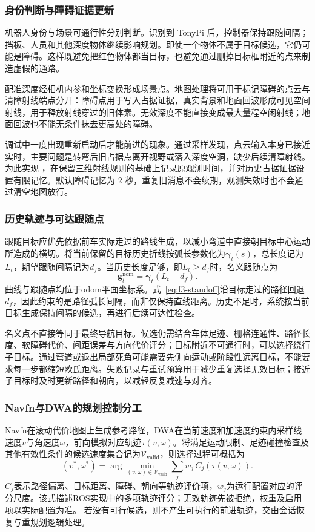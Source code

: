 \subsubsection{身份判断与障碍证据更新}
机器人身份与场景可通行性分别判断。识别到 TonyPi 后，控制器保持跟随间隔；挡板、人员和其他深度物体继续影响规划。即使一个物体不属于目标候选，它仍可能是障碍。这样既避免把红色物体都当目标，也避免通过删掉目标框附近的点来制造虚假的通路。

配准深度经相机内参和坐标变换形成场景点。地图处理将可用于标记障碍的点云与清障射线端点分开：障碍点用于写入占据证据，真实背景和地面回波形成可见空间射线，用于释放射线穿过的旧体素。无效深度不能直接变成最大量程空闲射线；地面回波也不能无条件抹去更高处的障碍。

调试中一度出现重新启动后才能前进的现象。通过采样发现，点云输入本身已接近实时，主要问题是转弯后旧占据点离开视野或落入深度空洞，缺少后续清障射线。为此实现 ，在保留三维射线规则的基础上记录原观测时间，并对历史占据证据设置有限记忆。默认障碍记忆为 2 秒，重复旧消息不会续期，观测失效时也不会通过清空地图放行。
\subsubsection{历史轨迹与可达跟随点}
跟随目标应优先依据前车实际走过的路线生成，以减小弯道中直接朝目标中心运动所造成的横切。将当前保留的目标历史折线按弧长参数化为$\boldsymbol\gamma_t(s)$，总长度记为$L_t$，期望跟随间隔记为$d_f$。当历史长度足够，即$L_t\geq d_f$时，名义跟随点为
\begin{equation}\label{eq:f3-standoff}
\mathbf g_t^{\mathrm{nom}}=\boldsymbol\gamma_t(L_t-d_f).
\end{equation}
曲线与跟随点均位于odom平面坐标系。式~\eqref{eq:f3-standoff}沿目标走过的路径回退$d_f$，因此约束的是路径弧长间隔，而非仅保持直线距离。历史不足时，系统按当前目标生成保持间隔的候选，再进行后续可达性检查。

名义点不直接等同于最终导航目标。候选仍需结合车体足迹、栅格连通性、路径长度、软障碍代价、间距误差与方向代价评分；目标附近不可通行时，可以选择绕行子目标。通过弯道或退出局部死角可能需要先侧向运动或阶段性远离目标，不能要求每一步都缩短欧氏距离。失败记录与重试预算用于减少重复选择无效目标；接近子目标时及时更新路径和朝向，以减轻反复减速与对齐。

\subsubsection{Navfn与DWA的规划控制分工}
Navfn在滚动代价地图上生成参考路径，DWA在当前速度和加速度约束内采样线速度$v$与角速度$\omega$，前向模拟对应轨迹$\tau(v,\omega)$。将满足运动限制、足迹碰撞检查及其他有效性条件的候选速度集合记为$\mathcal V_{\mathrm{valid}}$，则选择过程可概括为
\begin{equation}\label{eq:f3-dwa}
(v^{*},\omega^{*})=
\arg\min_{(v,\omega)\in\mathcal V_{\mathrm{valid}}}
\sum_{j} w_j\,C_j\!\left(\tau(v,\omega)\right).
\end{equation}
$C_j$表示路径偏离、目标距离、障碍、朝向等轨迹评价项，$w_j$为运行配置对应的评分尺度。该式描述ROS实现中的多项轨迹评分；无效轨迹先被拒绝，权重及启用项以实际配置为准。\cite{f3-dwa-foundation} 若没有可行候选，则不产生可执行的前进轨迹，交由会话恢复与重规划逻辑处理。

